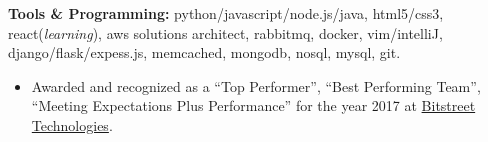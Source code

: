 \documentclass[11pt,a4paper]{article}
\newcommand{\quotes}[1]{``#1''}
\begin{document}
\spacedhrule{0.5em}{-0.4em}


\inlineheadedsection
{\textbf{Tools \& Programming:}}
{python/\nsp javascript/\nsp node.js/\nsp java}, html5/css3, react(\textit{learning}), aws solutions architect, rabbitmq, docker, vim/\nsp intelliJ, django/flask/expess.js, memcached, mongodb, nosql, mysql, git.

%  

\spacedhrule{1.6em}{-0.4em}

{%
    \begin{itemize}
    \item Awarded and recognized as a \quotes{Top Performer}, \quotes{Best Performing Team}, \quotes{Meeting Expectations Plus Performance} for the year 2017 at {\href{http://bitstreet.in/}{Bitstreet Technologies}}.
    \end{itemize}
}
\end{document}
